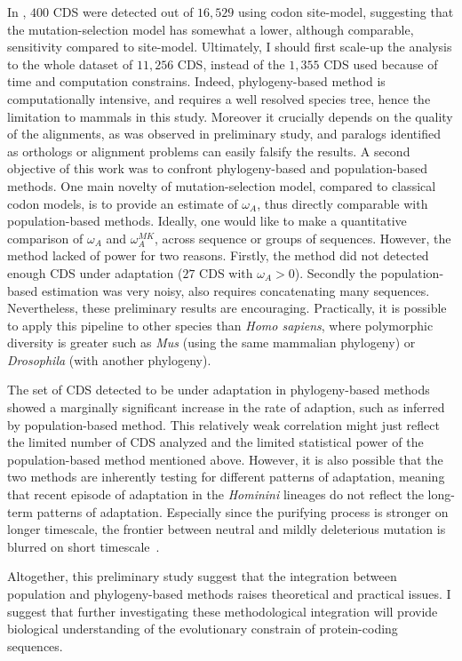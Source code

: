 \documentclass{article}
\begin{document}
In \citet{Kosiol2008}, $400$ CDS were detected out of $16,529$ using codon site-model, suggesting that the mutation-selection model has somewhat a lower, although comparable, sensitivity compared to site-model.
Ultimately, I should first scale-up the analysis to the whole dataset of $11,256$ CDS, instead of the $1,355$ CDS used because of time and computation constrains.
Indeed, phylogeny-based method is computationally intensive, and requires a well resolved species tree, hence the limitation to mammals in this study.
Moreover it crucially depends on the quality of the alignments, as was observed in preliminary study, and paralogs identified as orthologs or alignment problems can easily falsify the results.
A second objective of this work was to confront phylogeny-based and population-based methods.
One main novelty of mutation-selection model, compared to classical codon models, is to provide an estimate of $\omega_A$, thus directly comparable with population-based methods.
Ideally, one would like to make a quantitative comparison of $\omega_A$ and $\omega_A^{MK}$, across sequence or groups of sequences.
However, the method lacked of power for two reasons.
Firstly, the method did not detected enough CDS under adaptation ($27$ CDS with $\omega_A > 0$).
Secondly the population-based estimation was very noisy, also requires concatenating many sequences.
Nevertheless, these preliminary results are encouraging.
Practically, it is possible to apply this pipeline to other species than \textit{Homo sapiens}, where polymorphic diversity is greater such as \textit{Mus} (using the same mammalian phylogeny) or \textit{Drosophila} (with another phylogeny).

The set of CDS detected to be under adaptation in phylogeny-based methods showed a marginally significant increase in the rate of adaption, such as inferred by population-based method.
This relatively weak correlation might just reflect the limited number of CDS analyzed and the limited statistical power of the population-based method mentioned above.
However, it is also possible that the two methods are inherently testing for different patterns of adaptation, meaning that recent episode of adaptation in the \textit{Hominini} lineages do not reflect the long-term patterns of adaptation.
Especially since the purifying process is stronger on longer timescale, the frontier between neutral and mildly deleterious mutation is blurred on short timescale~\citep{ho_time_2005}.

Altogether, this preliminary study suggest that the integration between population and phylogeny-based methods raises theoretical and practical issues.
I suggest that further investigating these methodological integration will provide biological understanding of the evolutionary constrain of protein-coding sequences.
\end{document}
